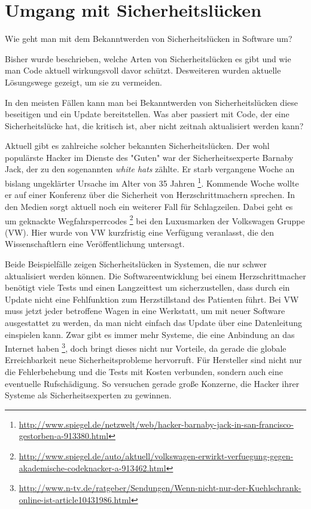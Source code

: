 \section{Umgang mit Sicherheitslücken}
Wie geht man mit dem Bekanntwerden von Sicherheitslücken in Software um?

Bisher wurde beschrieben, welche Arten von Sicherheitslücken es gibt und 
wie man Code aktuell wirkungsvoll davor schützt. Desweiteren wurden aktuelle 
Lösungswege gezeigt, um sie zu vermeiden.

In den meisten Fällen kann man bei Bekanntwerden von Sicherheitslücken
diese beseitigen und ein Update bereitstellen.
Was aber passiert mit Code, der eine Sicherheitslücke hat, die
kritisch ist, aber nicht zeitnah aktualisiert werden kann?

Aktuell gibt es zahlreiche solcher bekannten Sicherheitslücken. Der wohl 
populärste Hacker im Dienste des "Guten" war der Sicherheitsexperte 
Barnaby Jack, der zu den sogenannten \textit{white hats} zählte. Er starb 
vergangene Woche an bislang ungeklärter Ursache im Alter von 35 Jahren
\footnote{\url{http://www.spiegel.de/netzwelt/web/hacker-barnaby-jack-in-san-francisco-gestorben-a-913380.html}}. 
Kommende Woche wollte er auf einer Konferenz über die Sicherheit von 
Herzschrittmachern sprechen.
In den Medien sorgt aktuell noch ein weiterer Fall für Schlagzeilen.
Dabei geht es um geknackte Wegfahrsperrcodes
\footnote{\url{http://www.spiegel.de/auto/aktuell/volkswagen-erwirkt-verfuegung-gegen-akademische-codeknacker-a-913462.html}} 
bei den Luxusmarken der Volkswagen Gruppe (VW).
Hier wurde von VW kurzfristig eine Verfügung veranlasst, die den Wissenschaftlern
eine Veröffentlichung untersagt.

Beide Beispielfälle zeigen Sicherheitslücken in Systemen, die
nur schwer aktualisiert werden können. 
Die Softwareentwicklung bei einem Herzschrittmacher benötigt viele
Tests und einen Langzeittest um sicherzustellen, dass durch ein Update
nicht eine Fehlfunktion zum Herzstillstand des Patienten führt. 
Bei VW muss jetzt jeder betroffene Wagen in eine Werkstatt, um mit neuer
Software ausgestattet zu werden, da man nicht einfach das Update über 
eine Datenleitung einspielen kann. 
Zwar gibt es immer mehr Systeme, die eine Anbindung an das Internet haben
\footnote{\url{http://www.n-tv.de/ratgeber/Sendungen/Wenn-nicht-nur-der-Kuehlschrank-online-ist-article10431986.html}}, 
doch bringt dieses nicht nur Vorteile, da gerade die globale Erreichbarkeit
neue Sicherheitsprobleme hervorruft.  
Für Hersteller sind nicht nur die Fehlerbehebung und die Tests mit 
Kosten verbunden, sondern auch eine eventuelle Rufschädigung. So versuchen
gerade große Konzerne, die Hacker ihrer Systeme als Sicherheitsexperten 
zu gewinnen.

